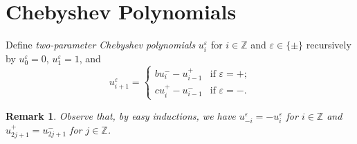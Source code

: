 \documentclass[pdflatex,sn-mathphys]{sn-jnl}%
\theoremstyle{thmstyleone}%
\theoremstyle{thmstyletwo}%
\newtheorem{remark}[theorem]{Remark}%
\theoremstyle{thmstylethree}%
\newcommand{\ZZ}{\mathbb{Z}}
\begin{document}
\section{Chebyshev Polynomials}
  \label{sec:chebyshev}
  Define \emph{two-parameter Chebyshev polynomials} $u_i^\varepsilon$ for $i\in\ZZ$ and $\varepsilon\in\{\pm\}$ recursively by $u_0^\varepsilon=0$, $u_1^\varepsilon=1$, and
  \[u_{i+1}^\varepsilon=\begin{cases} bu_i^- -u_{i-1}^+ & \text{if $\varepsilon=+$;}\\ cu_i^+-u_{i-1}^- & \text{if $\varepsilon=-$.} \end{cases}\]
  \begin{remark}
    \label{rem:equivalences}
    Observe that, by easy inductions, we have $u_{-i}^\varepsilon=-u_i^\varepsilon$ for $i\in\ZZ$ and $u_{2j+1}^+=u_{2j+1}^-$ for $j\in\ZZ$.
  \end{remark}
\end{document}
